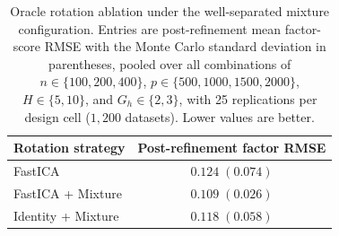 \begin{table}[t]
\centering
\caption{Oracle rotation ablation under the well-separated mixture configuration. Entries are post-refinement mean factor-score RMSE with the Monte Carlo standard deviation in parentheses, pooled over all combinations of $n\in\{100,200,400\}$, $p\in\{500,1000,1500,2000\}$, $H\in\{5,10\}$, and $G_h\in\{2,3\}$, with 25 replications per design cell ($1{,}200$ datasets). Lower values are better.}
\label{tab:rotation_ablation_separated}
\begin{tabular}{lc}
\toprule
Rotation strategy & Post-refinement factor RMSE \\
\midrule
FastICA             & $0.124\;(0.074)$ \\
FastICA + Mixture   & $\mathbf{0.109}\;(\mathbf{0.026})$ \\
Identity + Mixture  & $0.118\;(0.058)$ \\
\bottomrule
\end{tabular}
\end{table}
